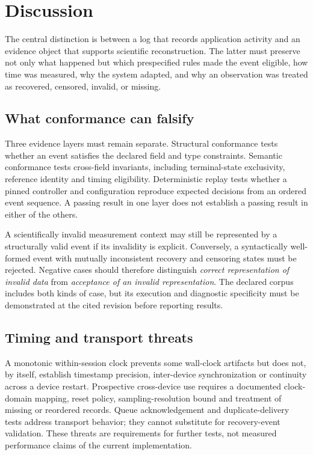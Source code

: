 \section{Discussion}

The central distinction is between a log that records application activity and an evidence object that supports scientific reconstruction. The latter must preserve not only what happened but which prespecified rules made the event eligible, how time was measured, why the system adapted, and why an observation was treated as recovered, censored, invalid, or missing.

\subsection{What conformance can falsify}

Three evidence layers must remain separate. Structural conformance tests whether an event satisfies the declared field and type constraints. Semantic conformance tests cross-field invariants, including terminal-state exclusivity, reference identity and timing eligibility. Deterministic replay tests whether a pinned controller and configuration reproduce expected decisions from an ordered event sequence. A passing result in one layer does not establish a passing result in either of the others.

A scientifically invalid measurement context may still be represented by a structurally valid event if its invalidity is explicit. Conversely, a syntactically well-formed event with mutually inconsistent recovery and censoring states must be rejected. Negative cases should therefore distinguish \emph{correct representation of invalid data} from \emph{acceptance of an invalid representation}. The declared corpus includes both kinds of case, but its execution and diagnostic specificity must be demonstrated at the cited revision before reporting results.

\subsection{Timing and transport threats}

A monotonic within-session clock prevents some wall-clock artifacts but does not, by itself, establish timestamp precision, inter-device synchronization or continuity across a device restart. Prospective cross-device use requires a documented clock-domain mapping, reset policy, sampling-resolution bound and treatment of missing or reordered records. Queue acknowledgement and duplicate-delivery tests address transport behavior; they cannot substitute for recovery-event validation. These threats are requirements for further tests, not measured performance claims of the current implementation.

